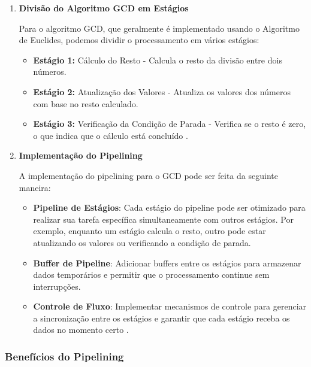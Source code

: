 \documentclass[a4paper,11pt]{article} %
\begin{document}
\begin{enumerate}
    \item \textbf{Divisão do Algoritmo GCD em Estágios}



Para o algoritmo GCD, que geralmente é implementado usando o Algoritmo de Euclides, podemos dividir o processamento em vários estágios:

\begin{itemize}
    \item \textbf{Estágio 1:} Cálculo do Resto - Calcula o resto da divisão entre dois números.
    \item \textbf{Estágio 2:} Atualização dos Valores - Atualiza os valores dos números com base no resto calculado.
    \item \textbf{Estágio 3:} Verificação da Condição de Parada - Verifica se o resto é zero, o que indica que o cálculo está concluído \cite{Knuth1997}.
\end{itemize}

 \item \textbf{Implementação do Pipelining}

A implementação do pipelining para o GCD pode ser feita da seguinte maneira:

\begin{itemize}
    \item \textbf{Pipeline de Estágios}: Cada estágio do pipeline pode ser otimizado para realizar sua tarefa específica simultaneamente com outros estágios. Por exemplo, enquanto um estágio calcula o resto, outro pode estar atualizando os valores ou verificando a condição de parada.
    \item \textbf{Buffer de Pipeline}: Adicionar buffers entre os estágios para armazenar dados temporários e permitir que o processamento continue sem interrupções.
    \item \textbf{Controle de Fluxo}: Implementar mecanismos de controle para gerenciar a sincronização entre os estágios e garantir que cada estágio receba os dados no momento certo \cite{Patterson2013}.
\end{itemize}

\end {enumerate}

\subsubsection{Benefícios do Pipelining}
\end{document}
